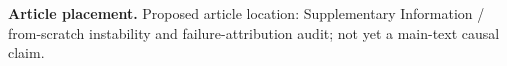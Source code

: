 \textbf{Article placement.} Proposed article location: Supplementary Information / from-scratch instability and failure-attribution audit; not yet a main-text causal claim.
